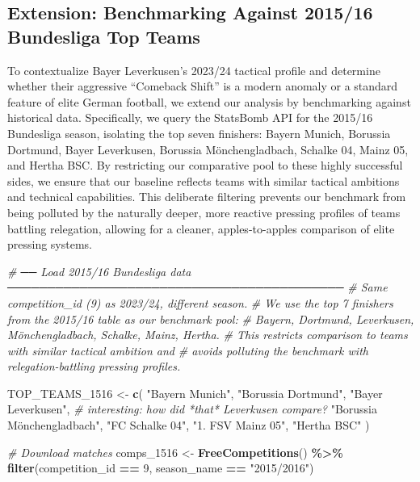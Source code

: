 \documentclass[
]{article}
\newenvironment{Shaded}{\begin{snugshade}}{\end{snugshade}}
\newcommand{\CommentTok}[1]{\textcolor[rgb]{0.56,0.35,0.01}{\textit{#1}}}
\newcommand{\DecValTok}[1]{\textcolor[rgb]{0.00,0.00,0.81}{#1}}
\newcommand{\FunctionTok}[1]{\textcolor[rgb]{0.13,0.29,0.53}{\textbf{#1}}}
\newcommand{\NormalTok}[1]{#1}
\newcommand{\OtherTok}[1]{\textcolor[rgb]{0.56,0.35,0.01}{#1}}
\newcommand{\SpecialCharTok}[1]{\textcolor[rgb]{0.81,0.36,0.00}{\textbf{#1}}}
\newcommand{\StringTok}[1]{\textcolor[rgb]{0.31,0.60,0.02}{#1}}
\begin{document}
\subsection{Extension: Benchmarking Against 2015/16 Bundesliga Top
Teams}\label{extension-benchmarking-against-201516-bundesliga-top-teams}

To contextualize Bayer Leverkusen's 2023/24 tactical profile and
determine whether their aggressive ``Comeback Shift'' is a modern
anomaly or a standard feature of elite German football, we extend our
analysis by benchmarking against historical data. Specifically, we query
the StatsBomb API for the 2015/16 Bundesliga season, isolating the top
seven finishers: Bayern Munich, Borussia Dortmund, Bayer Leverkusen,
Borussia Mönchengladbach, Schalke 04, Mainz 05, and Hertha BSC. By
restricting our comparative pool to these highly successful sides, we
ensure that our baseline reflects teams with similar tactical ambitions
and technical capabilities. This deliberate filtering prevents our
benchmark from being polluted by the naturally deeper, more reactive
pressing profiles of teams battling relegation, allowing for a cleaner,
apples-to-apples comparison of elite pressing systems.

\begin{Shaded}
\begin{Highlighting}[]
\CommentTok{\# ── Load 2015/16 Bundesliga data ──────────────────────────────────────────}
\CommentTok{\# Same competition\_id (9) as 2023/24, different season.}
\CommentTok{\# We use the top 7 finishers from the 2015/16 table as our benchmark pool:}
\CommentTok{\# Bayern, Dortmund, Leverkusen, Mönchengladbach, Schalke, Mainz, Hertha.}
\CommentTok{\# This restricts comparison to teams with similar tactical ambition and}
\CommentTok{\# avoids polluting the benchmark with relegation{-}battling pressing profiles.}

\NormalTok{TOP\_TEAMS\_1516 }\OtherTok{\textless{}{-}} \FunctionTok{c}\NormalTok{(}
  \StringTok{"Bayern Munich"}\NormalTok{,}
  \StringTok{"Borussia Dortmund"}\NormalTok{,}
  \StringTok{"Bayer Leverkusen"}\NormalTok{,       }\CommentTok{\# interesting: how did *that* Leverkusen compare?}
  \StringTok{"Borussia Mönchengladbach"}\NormalTok{,}
  \StringTok{"FC Schalke 04"}\NormalTok{,}
  \StringTok{"1. FSV Mainz 05"}\NormalTok{,}
  \StringTok{"Hertha BSC"}
\NormalTok{)}

\CommentTok{\# Download matches}
\NormalTok{comps\_1516 }\OtherTok{\textless{}{-}} \FunctionTok{FreeCompetitions}\NormalTok{() }\SpecialCharTok{\%\textgreater{}\%}
  \FunctionTok{filter}\NormalTok{(competition\_id }\SpecialCharTok{==} \DecValTok{9}\NormalTok{, season\_name }\SpecialCharTok{==} \StringTok{"2015/2016"}\NormalTok{)}
\end{Highlighting}
\end{Shaded}
\end{document}
